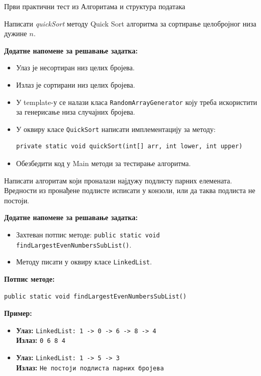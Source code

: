 
Први практични тест из Алгоритама и структура података

Написати \textit{quickSort} методу Quick Sort алгоритма за сортирање целобројног низа дужине $n$.

\textbf{Додатне напомене за решавање задатка:}
\begin{itemize}
	\item Улаз је несортиран низ целих бројева.
	\item Излаз је сортирани низ целих бројева.
	\item У template-у се налази класа \texttt{RandomArrayGenerator} коју треба искористити за генерисање низа случајних бројева.
	\item У оквиру класе \texttt{QuickSort} написати имплементацију за методу:
	\begin{Verbatim}[fontsize=\small]
private static void quickSort(int[] arr, int lower, int upper)
	\end{Verbatim}
	\item Обезбедити код у Main методи за тестирање алгоритма.
\end{itemize}

Написати алгоритам који проналази најдужу подлисту парних елемената. Вредности из пронађене подлисте исписати у конзоли, или да таква подлиста не постоји.

\textbf{Додатне напомене за решавање задатка:}
\begin{itemize}
	\item Захтеван потпис методе: \texttt{public static void findLargestEvenNumbersSubList()}.
	\item Методу писати у оквиру класе \texttt{LinkedList}.
\end{itemize}

\textbf{Потпис методе:}
\begin{Verbatim}[fontsize=\small]
public static void findLargestEvenNumbersSubList()
\end{Verbatim}

\textbf{Пример:}
\begin{itemize}
	\item \textbf{Улаз:} \texttt{LinkedList: 1 -> 0 -> 6 -> 8 -> 4} \\
	      \textbf{Излаз:} \texttt{0 6 8 4}
	\item \textbf{Улаз:} \texttt{LinkedList: 1 -> 5 -> 3} \\
	      \textbf{Излаз:} \texttt{Не постоји подлиста парних бројева}
\end{itemize}

